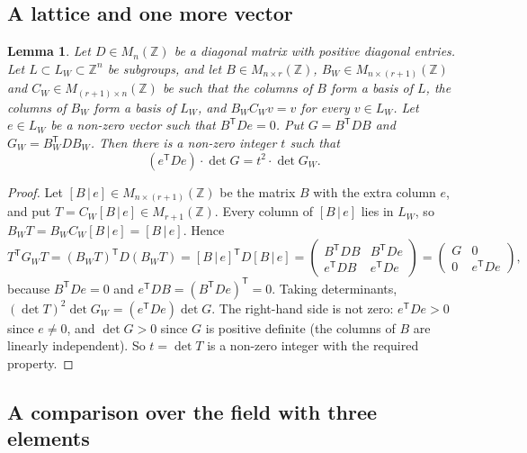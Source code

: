 \documentclass[11pt,a4paper]{article}
\newtheorem{lemma}[theorem]{Lemma}
\theoremstyle{remark}
\newcommand{\ZZ}{\mathbb{Z}}
\newcommand{\tp}{\mathsf{T}}
\begin{document}
\subsection{A lattice and one more vector}

\begin{lemma}\label{lem:index}
Let $D\in M_n(\ZZ)$ be a diagonal matrix with positive diagonal entries. Let $L\subset L_W\subset\ZZ^n$ be
subgroups, and let $B\in M_{n\times r}(\ZZ)$, $B_W\in M_{n\times(r+1)}(\ZZ)$ and $C_W\in M_{(r+1)\times n}(\ZZ)$ be
such that the columns of $B$ form a basis of $L$, the columns of $B_W$ form a basis of $L_W$, and $B_WC_Wv=v$ for
every $v\in L_W$. Let $e\in L_W$ be a non-zero vector such that $B^{\tp}De=0$. Put $G=B^{\tp}DB$ and
$G_W=B_W^{\tp}DB_W$. Then there is a non-zero integer $t$ such that
\[
(e^{\tp}De)\cdot\det G=t^2\cdot\det G_W .
\]
\end{lemma}
\begin{proof}
Let $[B\,|\,e]\in M_{n\times(r+1)}(\ZZ)$ be the matrix $B$ with the extra column $e$, and put
$T=C_W[B\,|\,e]\in M_{r+1}(\ZZ)$. Every column of $[B\,|\,e]$ lies in $L_W$, so $B_WT=B_WC_W[B\,|\,e]=[B\,|\,e]$.
Hence
\[
T^{\tp}G_WT=(B_WT)^{\tp}D(B_WT)=[B\,|\,e]^{\tp}D[B\,|\,e]
=\begin{pmatrix}B^{\tp}DB&B^{\tp}De\\ e^{\tp}DB&e^{\tp}De\end{pmatrix}
=\begin{pmatrix}G&0\\0&e^{\tp}De\end{pmatrix},
\]
because $B^{\tp}De=0$ and $e^{\tp}DB=(B^{\tp}De)^{\tp}=0$. Taking determinants,
$(\det T)^2\det G_W=(e^{\tp}De)\det G$. The right-hand side is not zero: $e^{\tp}De>0$ since $e\ne0$, and
$\det G>0$ since $G$ is positive definite (the columns of $B$ are linearly independent). So $t=\det T$ is a non-zero
integer with the required property.
\end{proof}

\subsection{A comparison over the field with three elements}
\end{document}
